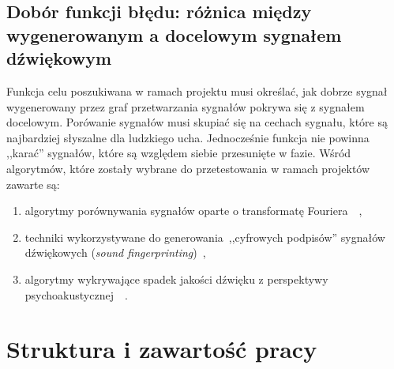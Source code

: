 

\subsection{Dobór funkcji błędu: różnica między wygenerowanym a docelowym sygnałem dźwiękowym}

Funkcja celu poszukiwana w ramach projektu musi określać, jak dobrze sygnał wygenerowany przez
graf przetwarzania sygnałów pokrywa się z sygnałem docelowym. Porówanie sygnałów musi skupiać się
na cechach sygnału, które są najbardziej słyszalne dla ludzkiego ucha. Jednocześnie funkcja nie powinna
,,karać'' sygnałów, które są względem siebie przesunięte w fazie. Wśród algorytmów, które zostały wybrane
do przetestowania w ramach projektów zawarte są:

\begin{enumerate}
  \item algorytmy porównywania sygnałów oparte o transformatę Fouriera~\cite{sliding_fourier}~\cite{mfcc},
  \item techniki wykorzystywane do generowania~,,cyfrowych podpisów'' sygnałów dźwiękowych (\textit{sound fingerprinting})~\cite{computer_vision_music_identification},
  \item algorytmy wykrywające spadek jakości dźwięku z perspektywy psychoakustycznej~\cite{peaq}~\cite{frechet_audio_distance}.
\end{enumerate}

\section{Struktura i zawartość pracy}


